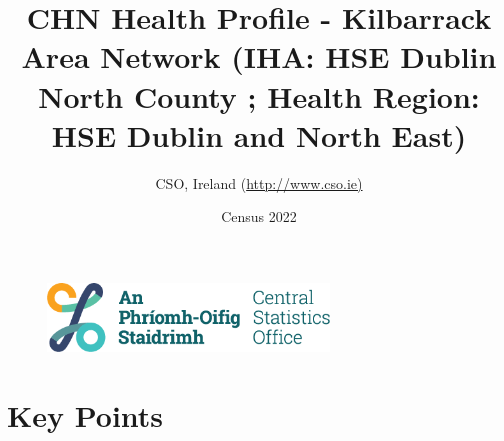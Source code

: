 \documentclass{article}
\title{CHN Health Profile - Kilbarrack Area Network (IHA: HSE Dublin North County ;  Health Region: HSE Dublin and North East) }
\date{Census 2022}
\author{CSO, Ireland  (\url{http://www.cso.ie)}}
\begin{document}


\begin{figure}
	\centering
\includegraphics[width =75mm]{../figures/CSO_Logo.png}
\end{figure}

				 
		   
						  
														  
																																													
												 
			 
\maketitle
					
													   
				 
						 
																																																																											   
				 
				  
  \pagebreak
    	    \tableofcontents

\pagebreak


\section{Key Points}
\end{document}
